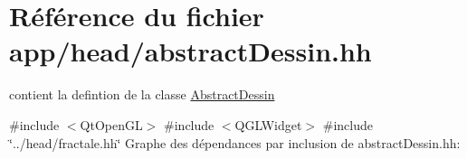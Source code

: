 \hypertarget{abstractDessin_8hh}{}\section{Référence du fichier app/head/abstract\+Dessin.hh}
\label{abstractDessin_8hh}


contient la defintion de la classe \hyperlink{classAbstractDessin}{Abstract\+Dessin}  


{\ttfamily \#include $<$Qt\+Open\+GL$>$}\newline
{\ttfamily \#include $<$Q\+G\+L\+Widget$>$}\newline
{\ttfamily \#include \char`\"{}../head/fractale.\+hh\char`\"{}}\newline
Graphe des dépendances par inclusion de abstract\+Dessin.\+hh\+:
